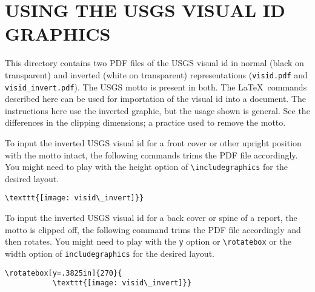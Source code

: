\documentclass[11pt]{article}
\begin{document}
\section*{USING THE USGS VISUAL ID GRAPHICS}
This directory contains two PDF files of the USGS visual id in normal (black on transparent) and inverted (white on transparent) representations (\texttt{visid.pdf} and \texttt{visid\_invert.pdf}). The USGS motto is present in both. The \LaTeX\ commands described here can be used for importation of the visual id into a document. The instructions here use the inverted graphic, but the usage shown is general. See the differences in the clipping dimensions; a practice used to remove the motto.

To input the inverted USGS visual id for a front cover or other upright position with the motto intact, the following commands trims the PDF file accordingly. You might need to play with the height option of \verb=\includegraphics= for the desired layout.

\begin{verbatim}
\texttt{[image: visid\_invert]}}
\end{verbatim}

To input the inverted USGS visual id for a back cover or spine of a report, the motto is clipped off, the following command trims the PDF file accordingly and then rotates. You might need to play with the \texttt{y} option or \verb=\rotatebox= or the width option of \verb=includegraphics= for the desired layout.

\begin{verbatim}
\rotatebox[y=.3825in]{270}{
           \texttt{[image: visid\_invert]}}
\end{verbatim}
\end{document}
